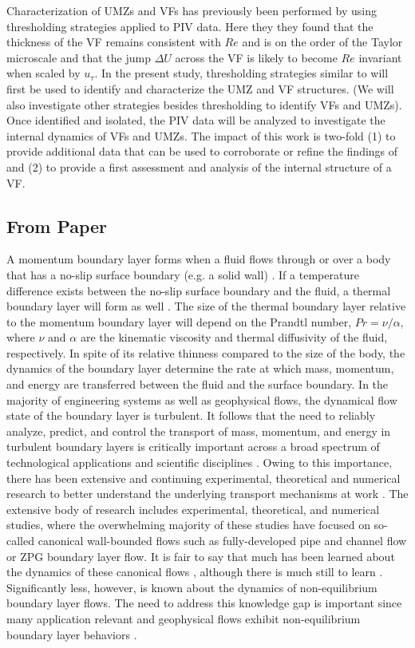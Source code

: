 Characterization of UMZs and VFs has previously been performed by \cite{Silva2017} using thresholding strategies applied to PIV data. Here they they found that the thickness of the VF remains consistent with $Re$ and is on the order of the Taylor microscale and that the jump $\Delta U$ across the VF is likely to become $Re$ invariant when scaled by $u_\tau$. In the present study, thresholding strategies similar to \cite{Silva2017} will first be used to identify and characterize the UMZ and VF structures. (We will also investigate other strategies besides thresholding to identify VFs and UMZs). Once identified and isolated, the PIV data will be analyzed to investigate the internal dynamics of VFs and UMZs.  The impact of this work is two-fold (1) to provide additional data that can be used to corroborate or refine the findings of \cite{Silva2017} and (2) to provide a first assessment and analysis of the internal structure of a VF. 

\subsection{From Paper}

A momentum boundary layer forms when a fluid flows through or over a body that has a no-slip surface boundary (e.g. a solid wall) \cite{prandtl1908}. If a temperature difference exists between the no-slip surface boundary and the fluid, a thermal boundary layer will form as well \cite{Kays1980}. The size of the thermal boundary layer relative to the momentum boundary layer will depend on the Prandtl number, $Pr = \nu/\alpha$, where $\nu$ and $\alpha$ are the kinematic viscosity and thermal diffusivity of the fluid, respectively. In spite of its relative thinness compared to the size of the body, the dynamics of the boundary layer determine the rate at which mass, momentum, and energy are transferred between the fluid and the surface boundary. In the majority of engineering systems as well as geophysical flows, the dynamical flow state of the boundary layer is turbulent.  It follows that the need to reliably analyze, predict, and control the transport of mass, momentum, and energy in turbulent boundary layers is critically important across a broad spectrum of technological applications and scientific disciplines \cite{Fox2012}. Owing to this importance, there has been extensive and continuing experimental, theoretical and numerical research to better understand the underlying transport mechanisms at work \cite{Clauser1956}. The extensive body of research includes experimental, theoretical, and numerical studies, where the overwhelming majority of these studies have focused on so-called canonical wall-bounded flows such as fully-developed pipe and channel flow or ZPG boundary layer flow. It is fair to say that much has been learned about the dynamics of these canonical flows \cite{Sreenivasan1997}, although there is much still to learn \cite{Sreenivasan1999, Jimenez2012}. Significantly less, however, is known about the dynamics of non-equilibrium boundary layer flows. The need to address this knowledge gap is important since many application relevant and geophysical flows exhibit non-equilibrium boundary layer behaviors \cite{Hara2009}.

